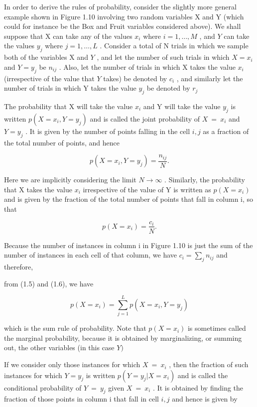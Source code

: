 \documentclass[
  10
]{article}
\begin{document}
In order to derive the rules of probability, consider the slightly more
general example shown in Figure 1.10 involving two random variables X
and Y (which could for instance be the Box and Fruit variables
considered above). We shall suppose that X can take any of the values
\(x _ { i }\) where \(i = 1 , \dots , M\) , and \(Y\) can take the
values \(y _ { j }\) where \(j = 1 , \dots , L\) . Consider a total of N
trials in which we sample both of the variables X and \(Y\) , and let
the number of such trials in which \(X = x _ { i }\) and
\(Y = y _ { j }\) be \(n _ { i j }\) . Also, let the number of trials in
which X takes the value \(x _ { i }\) (irrespective of the value that
\(Y\) takes) be denoted by \(c _ { i }\) , and similarly let the number
of trials in which Y takes the value \(y _ { j }\) be denoted by
\(r _ { j }\)

The probability that X will take the value \(x _ { i }\) and Y will take
the value \(y _ { j }\) is written
\(p ( X = x _ { i } , Y = y _ { j } )\) and is called the joint
probability of \(X ~ = ~ x _ { i }\) and \(Y = y _ { j }\) . It is given
by the number of points falling in the cell \(i , j\) as a fraction of
the total number of points, and hence

\[
p (X = x _ {i}, Y = y _ {j}) = \frac {n _ {i j}}{N}.\tag{1.5}
\]

Here we are implicitly considering the limit \(N \to \infty\) .
Similarly, the probability that X takes the value \(x _ { i }\)
irrespective of the value of Y is written as \(p ( X = x _ { i } )\) and
is given by the fraction of the total number of points that fall in
column i, so that

\[
p (X = x _ {i}) = \frac {c _ {i}}{N}.\tag{1.6}
\]

Because the number of instances in column i in Figure 1.10 is just the
sum of the number of instances in each cell of that column, we have
\(c _ { i } = \textstyle \sum _ { j } n _ { i j }\) and therefore,

from (1.5) and (1.6), we have

\[
p (X = x _ {i}) = \sum_ {j = 1} ^ {L} p (X = x _ {i}, Y = y _ {j})\tag{1.7}
\]

which is the sum rule of probability. Note that \(p ( X = x _ { i } )\)
is sometimes called the marginal probability, because it is obtained by
marginalizing, or summing out, the other variables (in this case \(Y )\)

If we consider only those instances for which \(X ~ = ~ x _ { i }\) ,
then the fraction of such instances for which \(Y = y _ { j }\) is
written \(p ( Y = y _ { j } | X = x _ { i } )\) and is called the
conditional probability of \(Y ~ = ~ y _ { j }\) given
\(X ~ = ~ x _ { i }\) . It is obtained by finding the fraction of those
points in column i that fall in cell \(i , j\) and hence is given by
\end{document}
